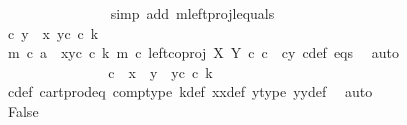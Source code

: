\begin{isabellebody}
\ \ \ \ \ \ \ \ \ \ \ \ \ \ \isamarkupfalse%
\ {\isacharparenleft}{\kern0pt}simp\ add{\isacharcolon}{\kern0pt}\ m{\isacharunderscore}{\kern0pt}leftproj{\isacharunderscore}{\kern0pt}l{\isacharunderscore}{\kern0pt}equals{\isacharparenright}{\kern0pt}\ \ \ \ \ \ \isanewline
\ \ \ \ \ \ \ \ \ \ \ \ \isamarkupfalse%
\ \isamarkupfalse%
\ {\isachardoublequoteopen}{\isasymlangle}c{\isacharcomma}{\kern0pt}\ y{}{\isasymrangle}\ {\isacharequal}{\kern0pt}\ {\isasymlangle}x{}{\isacharcomma}{\kern0pt}\ y{}\isactrlsup c\ {\isasymcirc}\isactrlsub c\ k{\isasymrangle}{\isachardoublequoteclose}\isanewline
\ \ \ \ \ \ \ \ \ \ \ \ \ \ \ \ \isamarkupfalse%
\ {\isacartoucheopen}m\ {\isasymcirc}\isactrlsub c\ a\ {\isacharequal}{\kern0pt}\ {\isasymlangle}x{}{\isacharcomma}{\kern0pt}y{}\isactrlsup c\ {\isasymcirc}\isactrlsub c\ k{\isasymrangle}{\isacartoucheclose}\ {\isacartoucheopen}m\ {\isasymcirc}\isactrlsub c\ left{\isacharunderscore}{\kern0pt}coproj\ X\ Y\ {\isasymcirc}\isactrlsub c\ c\ {\isacharequal}{\kern0pt}\ {\isasymlangle}c{\isacharcomma}{\kern0pt}y{}{\isasymrangle}{\isacartoucheclose}\ c{\isacharunderscore}{\kern0pt}def\ eqs\ \isamarkupfalse%
\ auto\ \ \ \ \ \ \isanewline
\ \ \ \ \ \ \ \ \ \ \ \ \isamarkupfalse%
\ \isamarkupfalse%
\ {\isachardoublequoteopen}{\isacharparenleft}{\kern0pt}c\ {\isacharequal}{\kern0pt}\ x{}{\isacharparenright}{\kern0pt}\ {\isasymand}\ {\isacharparenleft}{\kern0pt}y{}\ {\isacharequal}{\kern0pt}\ y{}\isactrlsup c\ {\isasymcirc}\isactrlsub c\ k{\isacharparenright}{\kern0pt}{\isachardoublequoteclose}\isanewline
\ \ \ \ \ \ \ \ \ \ \ \ \ \ \isamarkupfalse%
\ c{\isacharunderscore}{\kern0pt}def\ cart{\isacharunderscore}{\kern0pt}prod{\isacharunderscore}{\kern0pt}eq{}\ comp{\isacharunderscore}{\kern0pt}type\ k{\isacharunderscore}{\kern0pt}def\ x{}x{}{\isacharunderscore}{\kern0pt}def{\isacharparenleft}{\kern0pt}{}{\isacharparenright}{\kern0pt}\ y{}{\isacharprime}{\kern0pt}{\isacharunderscore}{\kern0pt}type\ y{}y{}{\isacharunderscore}{\kern0pt}def{\isacharparenleft}{\kern0pt}{}{\isacharparenright}{\kern0pt}\ \isamarkupfalse%
\ auto\ \isanewline
\ \ \ \ \ \ \ \ \ \ \ \ \isamarkupfalse%
\ \isamarkupfalse%
\ False\isanewline
\ \ \ \ \ \ \ \ \ \ \ \ \ \ \isamarkupfalse%

\end{isabellebody}
